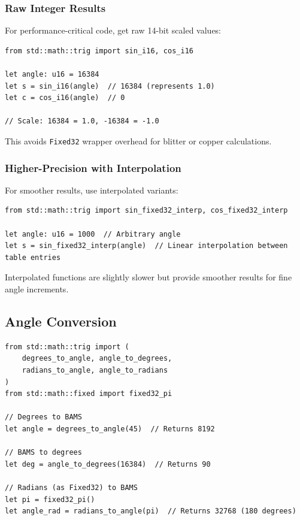 \subsubsection{Raw Integer Results}

For performance-critical code, get raw 14-bit scaled values:

\begin{lstlisting}
from std::math::trig import sin_i16, cos_i16

let angle: u16 = 16384
let s = sin_i16(angle)  // 16384 (represents 1.0)
let c = cos_i16(angle)  // 0

// Scale: 16384 = 1.0, -16384 = -1.0
\end{lstlisting}

This avoids \texttt{Fixed32} wrapper overhead for blitter or copper calculations.

\subsubsection{Higher-Precision with Interpolation}

For smoother results, use interpolated variants:

\begin{lstlisting}
from std::math::trig import sin_fixed32_interp, cos_fixed32_interp

let angle: u16 = 1000  // Arbitrary angle
let s = sin_fixed32_interp(angle)  // Linear interpolation between table entries
\end{lstlisting}

Interpolated functions are slightly slower but provide smoother results for fine angle increments.

\subsection{Angle Conversion}

\begin{lstlisting}
from std::math::trig import (
    degrees_to_angle, angle_to_degrees,
    radians_to_angle, angle_to_radians
)
from std::math::fixed import fixed32_pi

// Degrees to BAMS
let angle = degrees_to_angle(45)  // Returns 8192

// BAMS to degrees
let deg = angle_to_degrees(16384)  // Returns 90

// Radians (as Fixed32) to BAMS
let pi = fixed32_pi()
let angle_rad = radians_to_angle(pi)  // Returns 32768 (180 degrees)
\end{lstlisting}

